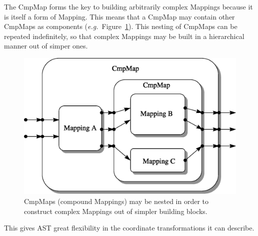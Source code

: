 \documentclass[twoside,11pt]{article}
\newenvironment{latexonly}{}{}
\begin{document}
\begin{latexonly}
   The CmpMap forms the key to building arbitrarily complex Mappings
   because it is itself a form of Mapping. This means that a CmpMap may
   contain other CmpMaps as components
   ({\em{e.g.}}\ Figure~\ref{fig:complexcmpmap}). This nesting of CmpMaps
   can be repeated indefinitely, so that complex Mappings may be built in
   a hierarchical manner out of simper ones.
   \begin{figure}
   \begin{center}
   \includegraphics[scale=0.6]{sun210_figures/complex.eps}
   \caption{CmpMaps (compound Mappings) may be nested in order to
   construct complex Mappings out of simpler building blocks.}
   \label{fig:complexcmpmap}
   \end{center}
   \end{figure}
   This gives AST great flexibility in the coordinate transformations it
   can describe.
\end{latexonly}
\end{document}
